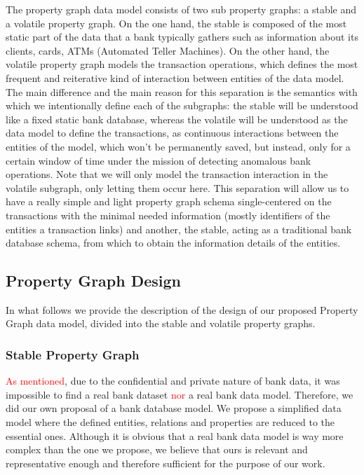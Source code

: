 \documentclass{article}
\begin{document}
The property graph data model consists of two sub property graphs: a stable and a volatile property graph. On the one hand, the stable is composed of the most static part of the data that a bank typically gathers such as information about its clients, cards, ATMs (Automated Teller Machines). 
On the other hand, the volatile property graph models the transaction operations, which defines the most frequent and reiterative kind of interaction between entities of the data model.\\
The main difference and the main reason for this separation is the semantics with which we intentionally define each of the subgraphs: the stable will be understood like a fixed static bank database, whereas the volatile will be understood as the data model to define the transactions, as continuous interactions between the entities of the model, which won't be permanently saved, but instead, only for a certain window of time under the mission of detecting anomalous bank operations. Note that we will only model the transaction interaction in the volatile subgraph, only letting them occur here.
This separation will allow us to have a really simple and light property graph schema single-centered on the transactions with the minimal needed information (mostly identifiers of the entities a transaction links) and another, the stable, acting as a traditional bank database schema, from which to obtain the information details of the entities.

\subsection{Property Graph Design}

In what follows we provide the description of the design of our proposed
Property Graph data model, divided into the stable and volatile property
graphs.

\subsubsection{Stable Property Graph}

\textcolor{red}{As mentioned}, due to the confidential and private nature of bank data, it was
impossible to find a real bank dataset \textcolor{red}{nor} a real bank data model. Therefore, we did our own proposal of a bank database model.
We propose a simplified data model where the defined entities, relations and properties are reduced to the essential ones.
Although it is obvious that a real bank data model is way more complex than the one we propose, we believe that ours is relevant and representative enough and therefore sufficient for the purpose of our work. 
\end{document}
